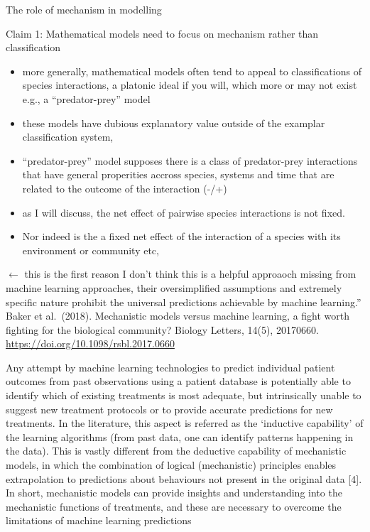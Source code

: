 \documentclass[
  ignorenonframetext,
]{beamer}
\begin{document}
\begin{frame}{The role of mechanism in modelling}
\begin{block}{Claim 1: Mathematical models need to focus on mechanism
rather than classification}
\protect\hypertarget{claim-1-mathematical-models-need-to-focus-on-mechanism-rather-than-classification}{}
\begin{itemize}
\item
  more generally, mathematical models often tend to appeal to
  classifications of species interactions, a platonic ideal if you will,
  which more or may not exist e.g., a ``predator-prey'' model
\item
  these models have dubious explanatory value outside of the examplar
  classification system,
\item
  ``predator-prey'' model supposes there is a class of predator-prey
  interactions that have general properities accross species, systems
  and time that are related to the outcome of the interaction (-/+)
\item
  as I will discuss, the net effect of pairwise species interactions is
  not fixed.
\item
  Nor indeed is the a fixed net effect of the interaction of a species
  with its environment or community etc,
\end{itemize}
\end{block}

\begin{block}{}
\protect\hypertarget{section}{}
\(\leftarrow\) this is the first reason I don't think this is a helpful
approaoch missing from machine learning approaches, their oversimplified
assumptions and extremely specific nature prohibit the universal
predictions achievable by machine learning.'' Baker et al.~(2018).
Mechanistic models versus machine learning, a fight worth fighting for
the biological community? Biology Letters, 14(5), 20170660.
\url{https://doi.org/10.1098/rsbl.2017.0660}

Any attempt by machine learning technologies to predict individual
patient outcomes from past observations using a patient database is
potentially able to identify which of existing treatments is most
adequate, but intrinsically unable to suggest new treatment protocols or
to provide accurate predictions for new treatments. In the literature,
this aspect is referred as the `inductive capability' of the learning
algorithms (from past data, one can identify patterns happening in the
data). This is vastly different from the deductive capability of
mechanistic models, in which the combination of logical (mechanistic)
principles enables extrapolation to predictions about behaviours not
present in the original data {[}4{]}. In short, mechanistic models can
provide insights and understanding into the mechanistic functions of
treatments, and these are necessary to overcome the limitations of
machine learning predictions


\end{block}
\end{frame}
\end{document}
